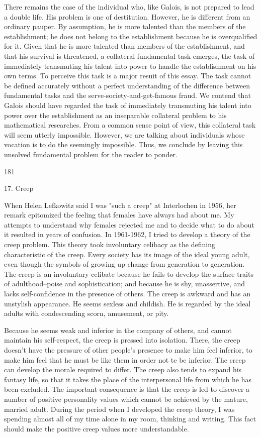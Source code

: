\documentclass[10pt,twoside]{memoir}
\begin{document}
\begin{enumerate}
{{There remains the case of the individual who, like Galois, is not 
prepared to lead a double life. His problem is one of destitution. However, 
he is different from an ordinary pauper. By assumption, he is more talented 
than the members of the establishment; he does not belong to the 
establishment because he is overqualified for it. Given that he is more 
talented than members of the establishment, and that his survival is 
threatened, a collateral fundamental task emerges, the task of immediately 
transmuting his talent into power to handle the establishment on his own 
terms. To perceive this task is a major resuit of this essay. The task cannot be 
defined accurately without a perfect understanding of the difference 
between fundamental tasks and the serve-society-and-get-famous fraud. We 
contend that Galois should have regarded the task of immediately 
transmuting his talent into power over the establishment as an inseparable 
collateral problem to his mathematical researches. From a common sense 
point of view, this collateral task will seem utterly impossible. However, we 
are talking about individuals whose vocation is to do the seemingly 
impossible. Thus, we conclude by leaving this unsolved fundamental problem 
for the reader to ponder. 


181 


17. Creep 


When Helen Lefkowitz said I was "such a creep" at Interlochen in 
1956, her remark epitomized the feeling that females have always had about 
me. My attempts to understand why females rejected me and to decide what 
to do about it resulted in years of confusion. In 1961-1962, I tried to 
develop a theory of the creep problem. This theory took involuntary 
celibacy as the defining characteristic of the creep. Every society has its 
image of the ideal young adult, even though the symbols of growing up 
change from generation to generation. The creep is an involuntary celibate 
because he fails to develop the surface traits of adulthood--poise and 
sophistication; and because he is shy, unassertive, and lacks self-confidence 
in the presence of others. The creep is awkward and has an unstylish 
appearance. He seems sexless and childish. He is regarded by the ideal adults 
with condescending scorn, amusement, or pity. 

Because he seems weak and inferior in the company of others, and 
cannot maintain his self-respect, the creep is pressed into isolation. There, 
the creep doesn't have the pressure of other people's presence to make him 
feel inferior, to make him feel that he must be like them in order not te be 
inferior. The creep can develop the morale required to differ. The creep also 
tends to expand his fantasy life, so that it takes the place of the 
interpersonal life from which he has been excluded. The important 
consequence is that the creep is led to discover a number of positive 
personality values which cannot be achieved by the mature, married adult. 
During the period when I developed the creep theory, I was spending almost 
all of my time alone in my room, thinking and writing. This fact should 
make the positive creep values more understandable. 

}}
\end{enumerate}
\end{document}

